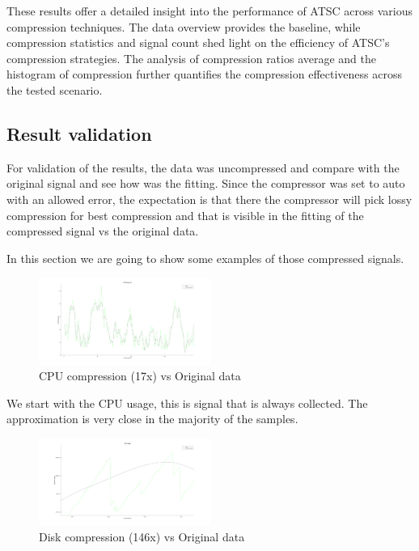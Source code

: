 \documentclass[conference]{IEEEtran}
\begin{document}
\vspace{10pt}

These results offer a detailed insight into the performance of ATSC across various compression techniques. 
The data overview provides the baseline, while compression statistics and signal count shed light on the efficiency of ATSC's compression strategies. 
The analysis of compression ratios average and the histogram of compression further quantifies the compression effectiveness across the tested scenario. 
 
\subsection{Result validation}

For validation of the results, the data was uncompressed and compare with the original signal and see how was the fitting. Since the compressor was set to auto with an allowed error, the expectation is that there the compressor will pick lossy compression for best compression and that is visible in the fitting of the compressed signal vs the original data.

In this section we are going to show some examples of those compressed signals.

\begin{figure}[h]
  \centering
  \includegraphics[width=0.5\textwidth]{cpu-usage-validation.png}
  \caption{CPU compression (17x) vs Original data}
  \label{cpu}
\end{figure}

We start with the CPU usage, this is signal that is always collected. 
The approximation is very close in the majority of the samples. 

\begin{figure}[h]
    \centering
    \includegraphics[width=0.5\textwidth]{disk-usage-validation.png}
    \caption{Disk compression (146x) vs Original data}
    \label{Disk}
  \end{figure}
\end{document}
